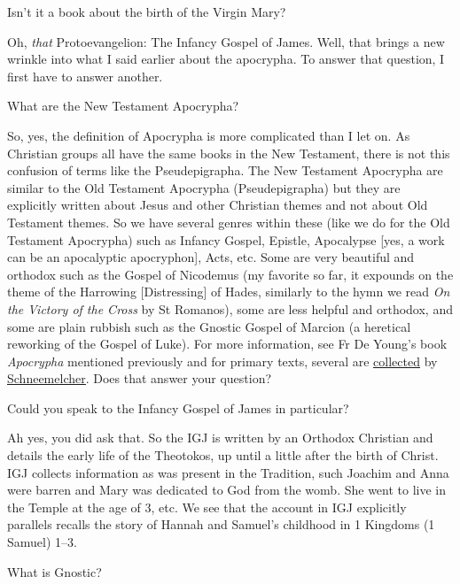 \documentclass[
]{article}
\begin{document}
Isn't it a book about the birth of the Virgin Mary?

Oh, \emph{that} Protoevangelion: The Infancy Gospel of James. Well, that
brings a new wrinkle into what I said earlier about the apocrypha. To
answer that question, I first have to answer another.

What are the New Testament Apocrypha?

So, yes, the definition of Apocrypha is more complicated than I let on.
As Christian groups all have the same books in the New Testament, there
is not this confusion of terms like the Pseudepigrapha. The New
Testament Apocrypha are similar to the Old Testament Apocrypha
(Pseudepigrapha) but they are explicitly written about Jesus and other
Christian themes and not about Old Testament themes. So we have several
genres within these (like we do for the Old Testament Apocrypha) such as
Infancy Gospel, Epistle, Apocalypse {[}yes, a work can be an apocalyptic
apocryphon{]}, Acts, etc. Some are very beautiful and orthodox such as
the Gospel of Nicodemus (my favorite so far, it expounds on the theme of
the Harrowing {[}Distressing{]} of Hades, similarly to the hymn we read
\emph{On the Victory of the Cross} by St Romanos), some are less helpful
and orthodox, and some are plain rubbish such as the Gnostic Gospel of
Marcion (a heretical reworking of the Gospel of Luke). For more
information, see Fr De Young's book \emph{Apocrypha} mentioned
previously and for primary texts, several are
\href{https://www.amazon.com/New-Testament-Apocrypha-Vol-Writings/dp/066422721X}{\ul{collected}}
by
\href{https://www.amazon.com/New-Testament-Apocrypha-Vol-Apocalypses/dp/0664227228}{\ul{Schneemelcher}}.
Does that answer your question?

Could you speak to the Infancy Gospel of James in particular?

Ah yes, you did ask that. So the IGJ is written by an Orthodox Christian
and details the early life of the Theotokos, up until a little after the
birth of Christ. IGJ collects information as was present in the
Tradition, such Joachim and Anna were barren and Mary was dedicated to
God from the womb. She went to live in the Temple at the age of 3, etc.
We see that the account in IGJ explicitly parallels recalls the story of
Hannah and Samuel's childhood in 1 Kingdoms (1 Samuel) 1--3.

What is Gnostic?
\end{document}
